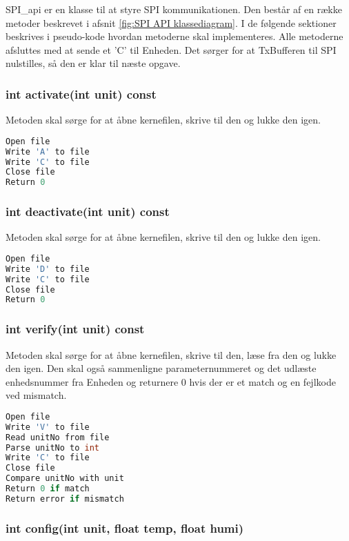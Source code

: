 
SPI\_api er en klasse til at styre SPI kommunikationen. Den består af en række metoder beskrevet i afsnit \ref{fig:SPI API klassediagram}. I de følgende sektioner beskrives i pseudo-kode hvordan metoderne skal implementeres. Alle metoderne afsluttes med at sende et 'C' til Enheden. Det sørger for at TxBufferen til SPI nulstilles, så den er klar til næste opgave.

\subsubsection*{int activate(int unit) const}

Metoden skal sørge for at åbne kernefilen, skrive til den og lukke den igen.

\begin{lstlisting}[language=C]
Open file
Write 'A' to file
Write 'C' to file
Close file
Return 0
\end{lstlisting} 
\subsubsection*{int deactivate(int unit) const}

Metoden skal sørge for at åbne kernefilen, skrive til den og lukke den igen.

\begin{lstlisting}[language=C]
Open file
Write 'D' to file
Write 'C' to file
Close file
Return 0
\end{lstlisting} 
\subsubsection*{int verify(int unit) const} 

Metoden skal sørge for at åbne kernefilen, skrive til den, læse fra den og lukke den igen.
Den skal også sammenligne parameternummeret og det udlæste enhedsnummer fra Enheden og returnere 0 hvis der er et match og en fejlkode ved mismatch.

\begin{lstlisting}[language=C]
Open file
Write 'V' to file
Read unitNo from file
Parse unitNo to int
Write 'C' to file
Close file
Compare unitNo with unit
Return 0 if match
Return error if mismatch
\end{lstlisting} 
\subsubsection*{int config(int unit, float temp, float humi)} 

